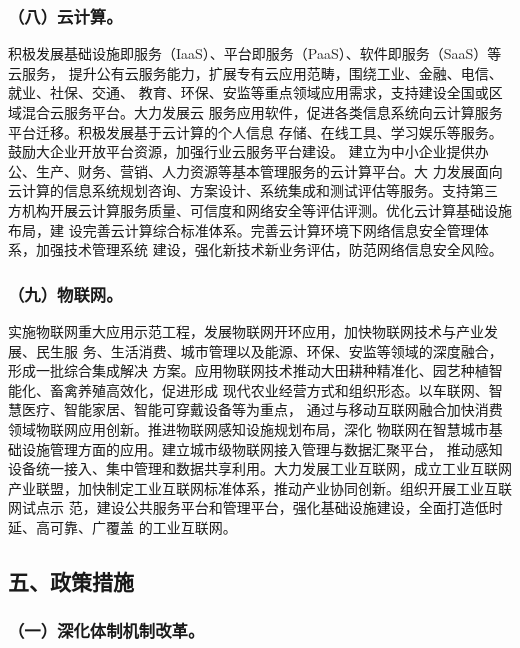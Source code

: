 \documentclass[11pt]{ctexart}
\begin{document}
{{{{\subsubsection{（八）云计算。}
\label{sec:orgcc1743b}

积极发展基础设施即服务（IaaS）、平台即服务（PaaS）、软件即服务（SaaS）等云服务，
提升公有云服务能力，扩展专有云应用范畴，围绕工业、金融、电信、就业、社保、交通、
教育、环保、安监等重点领域应用需求，支持建设全国或区域混合云服务平台。大力发展云
服务应用软件，促进各类信息系统向云计算服务平台迁移。积极发展基于云计算的个人信息
存储、在线工具、学习娱乐等服务。鼓励大企业开放平台资源，加强行业云服务平台建设。
建立为中小企业提供办公、生产、财务、营销、人力资源等基本管理服务的云计算平台。大
力发展面向云计算的信息系统规划咨询、方案设计、系统集成和测试评估等服务。支持第三
方机构开展云计算服务质量、可信度和网络安全等评估评测。优化云计算基础设施布局，建
设完善云计算综合标准体系。完善云计算环境下网络信息安全管理体系，加强技术管理系统
建设，强化新技术新业务评估，防范网络信息安全风险。

\subsubsection{（九）物联网。}
\label{sec:org05ff64f}

实施物联网重大应用示范工程，发展物联网开环应用，加快物联网技术与产业发展、民生服
务、生活消费、城市管理以及能源、环保、安监等领域的深度融合，形成一批综合集成解决
方案。应用物联网技术推动大田耕种精准化、园艺种植智能化、畜禽养殖高效化，促进形成
现代农业经营方式和组织形态。以车联网、智慧医疗、智能家居、智能可穿戴设备等为重点，
通过与移动互联网融合加快消费领域物联网应用创新。推进物联网感知设施规划布局，深化
物联网在智慧城市基础设施管理方面的应用。建立城市级物联网接入管理与数据汇聚平台，
推动感知设备统一接入、集中管理和数据共享利用。大力发展工业互联网，成立工业互联网
产业联盟，加快制定工业互联网标准体系，推动产业协同创新。组织开展工业互联网试点示
范，建设公共服务平台和管理平台，强化基础设施建设，全面打造低时延、高可靠、广覆盖
的工业互联网。



\subsection{五、政策措施}
\label{sec:org293663a}


\subsubsection{（一）深化体制机制改革。}
\label{sec:orgd2db6dd}

}}}}
\end{document}
